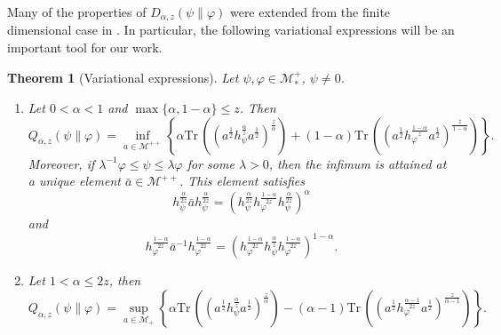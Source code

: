 \documentclass[12pt]{article}
\newtheorem{theorem}{Theorem}[section]
\theoremstyle{definition}
\theoremstyle{remark}
\numberwithin{equation}{section}
\def\Me{\mathcal M}
\def \Tr{\mathrm{Tr}\,}
\begin{document}
Many of the  properties of $D_{\alpha,z}(\psi\|\varphi)$ 
were extended from the finite dimensional case in \cite{kato2023onrenyi}. In particular,
the following variational expressions will be an important tool for our work.

\begin{theorem}[Variational expressions]\label{thm:variational} Let $\psi,\varphi\in \Me_*^+$, $\psi\ne 0$. 
\begin{enumerate}
\item[(i)] Let $0<\alpha<1$ and $\max\{\alpha,1-\alpha\}\le z$. Then
\[
Q_{\alpha,z}(\psi\|\varphi)=\inf_{a\in \Me^{++}}\left\{\alpha
\Tr\left((a^{\frac12}h_\psi^{\frac{\alpha}{z}}a^{\frac12})^{\frac{z}{\alpha}}\right)+(1-\alpha)
\Tr\left((a^{\frac12}h_\varphi^{\frac{1-\alpha}{z}}a^{\frac12})^{\frac{z}{1-\alpha}}\right) \right\}.
\]
Moreover, if $\lambda^{-1}\varphi\le \psi\le \lambda \varphi$ for some $\lambda>0$, then
the infimum is attained at a unique element  $\bar a\in \Me^{++}$. This element  satisfies
\[
h_\psi^{\frac{\alpha}{2z}}\bar ah_\psi^{\frac{\alpha}{2z}}=\left(h_\psi^{\frac{\alpha}{2z}}h_\varphi^{\frac{1-\alpha}{2z}}h_\psi^{\frac{\alpha}{2z}}\right)^\alpha
\]
and
\[
h_\varphi^{\frac{1-\alpha}{2z}}\bar a^{-1}h_\varphi^{\frac{1-\alpha}{2z}}=\left(h_\varphi^{\frac{1-\alpha}{2z}}h_\psi^{\frac{\alpha}{z}}h_\varphi^{\frac{1-\alpha}{2z}}\right)^{1-\alpha}.
\]

\item[(ii)] Let $1<\alpha\le 2z$, then
\[
Q_{\alpha,z}(\psi\|\varphi)=\sup_{a\in \Me_+} \left\{\alpha
\Tr\left((a^{\frac12}h_\psi^{\frac{\alpha}{z}}a^{\frac12})^{\frac{z}{\alpha}}\right)-(\alpha-1)
\Tr\left((a^{\frac12}h_\varphi^{\frac{\alpha-1}{2z}}a^{\frac12})^{\frac{z}{\alpha-1}}\right) \right\}.
\]

\end{enumerate}


\end{theorem}
\end{document}
